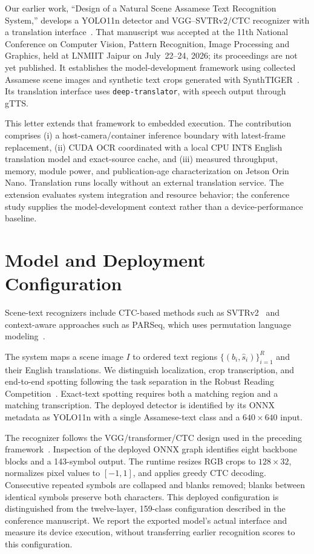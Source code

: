 \documentclass[cspaper,journal,10pt]{IEEEtran}
\begin{document}
Our earlier work, ``Design of a Natural Scene Assamese Text Recognition System,'' develops a YOLO11n detector and VGG--SVTRv2/CTC recognizer with a translation interface~\cite{prior}. That manuscript was accepted at the 11th National Conference on Computer Vision, Pattern Recognition, Image Processing and Graphics, held at LNMIIT Jaipur on July~22--24, 2026; its proceedings are not yet published. It establishes the model-development framework using collected Assamese scene images and synthetic text crops generated with SynthTIGER~\cite{synthtiger}. Its translation interface uses \texttt{deep-translator}, with speech output through gTTS.

This letter extends that framework to embedded execution. The contribution comprises (i) a host-camera/container inference boundary with latest-frame replacement, (ii) CUDA OCR coordinated with a local CPU INT8 English translation model and exact-source cache, and (iii) measured throughput, memory, module power, and publication-age characterization on Jetson Orin Nano. Translation runs locally without an external translation service. The extension evaluates system integration and resource behavior; the conference study supplies the model-development context rather than a device-performance baseline.

\section{Model and Deployment Configuration}
Scene-text recognizers include CTC-based methods such as SVTRv2~\cite{svtrv2} and context-aware approaches such as PARSeq, which uses permutation language modeling~\cite{parseq}.

The system maps a scene image $I$ to ordered text regions $\{(b_i,\hat{s}_i)\}_{i=1}^{R}$ and their English translations. We distinguish localization, crop transcription, and end-to-end spotting following the task separation in the Robust Reading Competition~\cite{rrc2015}. Exact-text spotting requires both a matching region and a matching transcription. The deployed detector is identified by its ONNX metadata as YOLO11n with a single Assamese-text class and a $640\times640$ input.

The recognizer follows the VGG/transformer/CTC design used in the preceding framework~\cite{prior,svtrv2,ctc}. Inspection of the deployed ONNX graph identifies eight backbone blocks and a 143-symbol output. The runtime resizes RGB crops to $128\times32$, normalizes pixel values to $[-1,1]$, and applies greedy CTC decoding. Consecutive repeated symbols are collapsed and blanks removed; blanks between identical symbols preserve both characters. This deployed configuration is distinguished from the twelve-layer, 159-class configuration described in the conference manuscript. We report the exported model's actual interface and measure its device execution, without transferring earlier recognition scores to this configuration.
\end{document}
